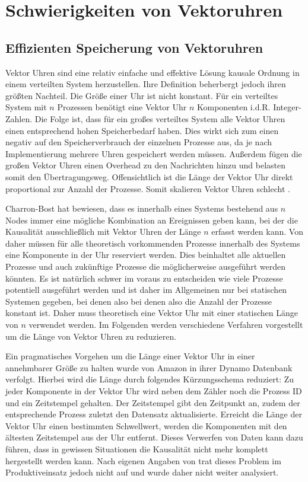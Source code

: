 \section{Schwierigkeiten von Vektoruhren}
\label{cap:problemeVC}
\subsection{Effizienten Speicherung von Vektoruhren}
Vektor Uhren sind eine relativ einfache und effektive Lösung kausale Ordnung in einem verteilten System herzustellen.
Ihre Definition beherbergt jedoch ihren größten Nachteil.
Die Größe einer Uhr ist nicht konstant.
Für ein verteiltes System mit $n$ Prozessen benötigt eine Vektor Uhr $n$ Komponenten i.d.R. Integer-Zahlen.
Die Folge ist, dass für ein großes verteiltes System alle Vektor Uhren einen entsprechend hohen Speicherbedarf haben.
Dies wirkt sich zum einen negativ auf den Speicherverbrauch der einzelnen Prozesse aus, da je nach Implementierung mehrere Uhren gespeichert werden müssen.
Außerdem fügen die großen Vektor Uhren einen Overhead zu den Nachrichten hinzu und belasten somit den Übertragungsweg.
Offensichtlich ist die Länge der Vektor Uhr direkt proportional zur Anzahl der Prozesse.
Somit skalieren Vektor Uhren schlecht \cite{torres1999plausible}.

Charron-Bost \cite{charron1990concerning} hat bewiesen, dass es innerhalb eines Systems bestehend aus $n$ Nodes immer eine mögliche Kombination an Ereignissen geben kann, bei der die Kausalität ausschließlich mit Vektor Uhren der Länge $n$ erfasst werden kann.
Von daher müssen für alle theoretisch vorkommenden Prozesse innerhalb des Systems eine Komponente in der Uhr reserviert werden.
Dies beinhaltet alle aktuellen Prozesse und auch zukünftige Prozesse die möglicherweise ausgeführt werden könnten.
Es ist natürlich schwer im voraus zu entscheiden wie viele Prozesse potentiell ausgeführt werden und ist daher im Allgemeinen nur bei statischen Systemen gegeben, bei denen also  bei denen also die Anzahl der Prozesse konstant ist.
Daher muss theoretisch eine Vektor Uhr mit einer statischen Länge von $n$ verwendet werden.
Im Folgenden werden verschiedene Verfahren vorgestellt um die Länge von Vektor Uhren zu reduzieren.

Ein pragmatisches Vorgehen um die Länge einer Vektor Uhr in einer annehmbarer Größe zu halten wurde von Amazon in ihrer Dynamo Datenbank \cite{decandia2007dynamo} verfolgt.
Hierbei wird die Länge durch folgendes Kürzungsschema reduziert:
Zu jeder Komponente in der Vektor Uhr wird neben dem Zähler noch die Prozess ID und ein Zeitstempel gehalten.
Der Zeitstempel gibt den Zeitpunkt an, zudem der entsprechende Prozess zuletzt den Datensatz aktualisierte.
Erreicht die Länge der Vektor Uhr einen bestimmten Schwellwert, werden die Komponenten mit den ältesten Zeitstempel aus der Uhr entfernt.
Dieses Verwerfen von Daten kann dazu führen, dass in gewissen Situationen die Kausalität nicht mehr komplett hergestellt werden kann.
Nach eigenen Angaben von  \cite{decandia2007dynamo} trat dieses Problem im Produktiveinsatz jedoch nicht auf und wurde daher nicht weiter analysiert.

